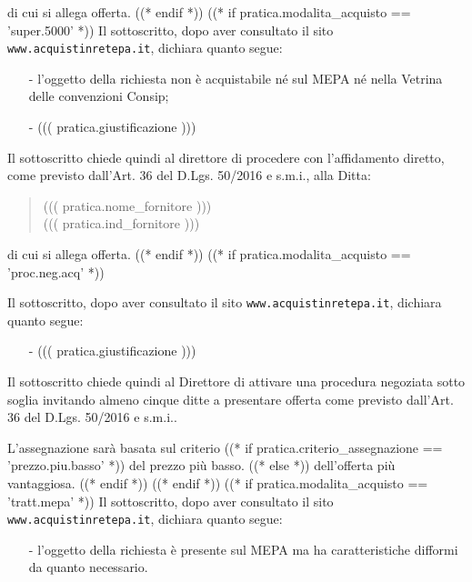 \documentclass[a4paper,12pt]{letter}
\begin{document}
di cui si allega offerta.
((* endif *))
((* if pratica.modalita_acquisto == 'super.5000' *))
Il sottoscritto, dopo aver consultato il sito {\tt www.acquistinretepa.it},
dichiara quanto segue:

\begin{itemize}
\item[-] l'oggetto della richiesta non \`e acquistabile n\'e sul MEPA n\'e
	 nella Vetrina delle convenzioni Consip;
\item[-] ((( pratica.giustificazione )))
\end{itemize}
Il sottoscritto chiede quindi al direttore di procedere con l'affidamento diretto,
come previsto dall'Art. 36 del D.Lgs. 50/2016 e s.m.i., alla Ditta: 
\begin{quote}
((( pratica.nome_fornitore )))\\
((( pratica.ind_fornitore )))
\end{quote}

di cui si allega offerta.
((* endif *))
((* if pratica.modalita_acquisto == 'proc.neg.acq' *))

Il sottoscritto, dopo aver consultato il sito {\tt www.acquistinretepa.it},
dichiara quanto segue:

\begin{itemize}
\item[-] ((( pratica.giustificazione )))
\end{itemize}

Il sottoscritto chiede quindi al Direttore di attivare una procedura negoziata
sotto soglia invitando almeno cinque ditte a presentare offerta come previsto
dall'Art. 36 del D.Lgs. 50/2016 e s.m.i..

L'assegnazione sar\`a basata sul criterio %
   ((* if pratica.criterio_assegnazione == 'prezzo.piu.basso' *)) %
del prezzo pi\`u basso.
   ((* else *)) %
dell'offerta pi\`u vantaggiosa.
   ((* endif *))
((* endif *))
((* if pratica.modalita_acquisto == 'tratt.mepa' *))
Il sottoscritto, dopo aver consultato il sito {\tt www.acquistinretepa.it},
dichiara quanto segue:

\begin{itemize}
\item[-] l'oggetto della richiesta \`e presente sul MEPA ma ha caratteristiche difformi
da quanto necessario.
\end{itemize}
\end{document}

